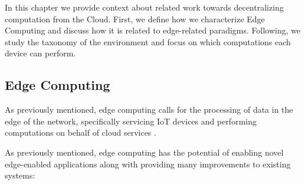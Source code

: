 
In this chapter we provide context about related work towards decentralizing computation from the Cloud. First, we define how we characterize Edge Computing and discuss how it is related to edge-related paradigms. Following, we study the taxonomy of the environment and focus on which computations each device can perform.

\subsection{Edge Computing}

As previously mentioned, edge computing calls for the processing of data in the edge of the network, specifically servicing IoT devices and performing computations on behalf of cloud services \cite{7488250}.

As previously mentioned, edge computing has the potential of enabling novel edge-enabled applications along with providing many improvements to existing systems:

